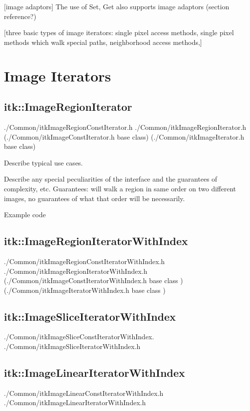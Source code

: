 [image adaptors]
The use of Set, Get also supports image adaptors (section reference?)

[three basic types of image iterators: single pixel access methods, single
pixel methods which walk special paths, neighborhood access methods,]

\section{Image Iterators}
\label{sec:ImageIterators}



\subsection{itk::ImageRegionIterator}
\label{sec:itkImageRegionIterator}
./Common/itkImageRegionConstIterator.h
./Common/itkImageRegionIterator.h
(./Common/itkImageConstIterator.h base class)
(./Common/itkImageIterator.h base class)

Describe typical use cases.

Describe any special peculiarities of the interface and the guarantees of
complexity, etc.  Guarantees: will walk a region in same order on two different
images, no guarantees of what that order will be necessarily.

Example code

\subsection{itk::ImageRegionIteratorWithIndex}
\label{sec:itkImageRegionIteratorWithIndex}
./Common/itkImageRegionConstIteratorWithIndex.h
./Common/itkImageRegionIteratorWithIndex.h
(./Common/itkImageConstIteratorWithIndex.h  base class )
(./Common/itkImageIteratorWithIndex.h  base class )

\subsection{itk::ImageSliceIteratorWithIndex}
\label{sec:itkImageSliceIteratorWithIndex}
./Common/itkImageSliceConstIteratorWithIndex.
./Common/itkImageSliceIteratorWithIndex.h

\subsection{itk::ImageLinearIteratorWithIndex}
\label{sec:itkImageLinearIteratorWithIndex}
./Common/itkImageLinearConstIteratorWithIndex.h
./Common/itkImageLinearIteratorWithIndex.h

